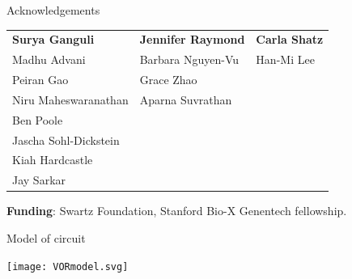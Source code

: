 \documentclass{beamer}%
\begin{document}
\begin{frame}{Acknowledgements}
%
 \begin{tabular}{lll}
   \textbf{Surya Ganguli} & \textbf{Jennifer Raymond} & \textbf{Carla Shatz} \\
   Madhu Advani & Barbara Nguyen-Vu & Han-Mi Lee \\
   Peiran Gao & Grace Zhao & \\
   Niru Maheswaranathan & Aparna Suvrathan \\
   Ben Poole \\
   Jascha Sohl-Dickstein \\
   Kiah Hardcastle \\
   Jay Sarkar
 \end{tabular}

 \vp\textbf{Funding}: Swartz Foundation, Stanford Bio-X Genentech fellowship.

%
\end{frame}

\appendix

\begin{frame}{Model of circuit}
%
 \begin{center}
   \texttt{[image: VORmodel.svg]}
 \end{center}
%
\end{frame}
\end{document}
